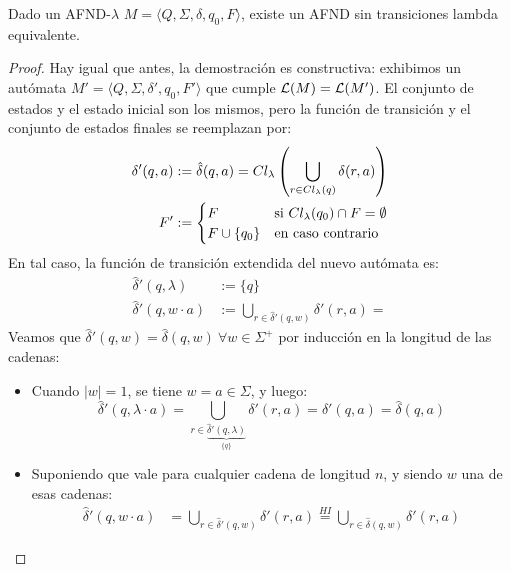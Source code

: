 \begin{theorem*}
    Dado un AFND-$\lambda$ $M = \langle Q, \Sigma, \delta, q_0, F \rangle$, existe un AFND sin transiciones lambda equivalente.
\end{theorem*}
\begin{proof}
    Hay igual que antes, la demostración es constructiva: exhibimos un autómata $M' = \langle Q, \Sigma, \delta', q_0, F' \rangle$ que cumple $\L(M) = \L(M')$. El conjunto de estados y el estado inicial son los mismos, pero la función de transición y el conjunto de estados finales se reemplazan por:
    $$
        \begin{aligned}
            \delta'(q, a) & := \hat \delta (q, a) = Cl_\lambda\left(\bigcup_{r \in Cl_\lambda(q)} \delta(r, a)\right) \\
            F'            & := \begin{cases}
                                   F              & \si Cl_\lambda (q_0) \cap F = \emptyset \\
                                   F \cup \{q_0\} & \ecc
                               \end{cases}
        \end{aligned}
    $$
    En tal caso, la función de transición extendida del nuevo autómata es:
    $$
        \begin{aligned}
            \hat \delta'(q, \lambda)   & := \{q\}                                              \\
            \hat \delta'(q, w \cdot a) & := \bigcup_{r \in \hat \delta'(q, w)} \delta'(r, a) =
        \end{aligned}
    $$
    Veamos que $\hat \delta'(q, w) = \hat \delta(q, w) \ \forall w \in \Sigma^+$ por inducción en la longitud de las cadenas:
    \begin{itemize}
        \item Cuando $|w| = 1$, se tiene $w = a \in \Sigma$, y luego:
              $$
                  \hat \delta'(q, \lambda \cdot a)
                  = \bigcup_{r \in \underbrace{\hat \delta'(q, \lambda)}_{\{q\}} } \delta'(r, a)
                  = \delta'(q, a) = \hat \delta(q, a)
              $$
        \item Suponiendo que vale para cualquier cadena de longitud $n$, y siendo $w$ una de esas cadenas:
              $$
                  \begin{aligned}
                      \hat \delta'(q, w \cdot a)
                       & = \bigcup_{r \in \hat \delta'(q, w)} \delta'(r, a)
                      \overset{HI}{=} \bigcup_{r \in \hat \delta(q, w)} \delta'(r, a)

\end{aligned}$$
\end{itemize}
\end{proof}
